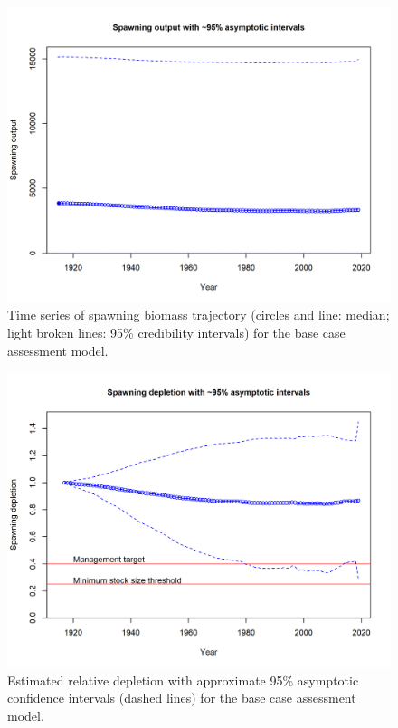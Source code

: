 \documentclass[12pt,]{article}
\begin{document}
\begin{figure}
\centering
\includegraphics{r4ss/plots_mod1/ts7_Spawning_output_with_95_asymptotic_intervals_intervals.png}
\caption{Time series of spawning biomass trajectory (circles and line:
median; light broken lines: 95\% credibility intervals) for the base
case assessment model. \label{fig:Spawnbio_all}}
\end{figure}

\begin{figure}
\centering
\includegraphics{r4ss/plots_mod1/ts9_Spawning_depletion_with_95_asymptotic_intervals_intervals.png}
\caption{Estimated relative depletion with approximate 95\% asymptotic
confidence intervals (dashed lines) for the base case assessment model.
\label{fig:RelDeplete_all}}
\end{figure}
\end{document}
